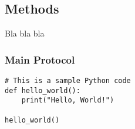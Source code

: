 \subsection{Methods}


Bla bla bla


\subsubsection{Main Protocol}

\begin{lstlisting}
# This is a sample Python code
def hello_world():
    print("Hello, World!")

hello_world()
\end{lstlisting}

